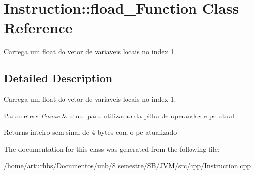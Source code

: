 \hypertarget{classInstruction_1_1fload__1Function}{}\section{Instruction\+:\+:fload\+\_\+Function Class Reference}
\label{classInstruction_1_1fload__1Function}


Carrega um float do vetor de variaveis locais no index 1.  




\subsection{Detailed Description}
Carrega um float do vetor de variaveis locais no index 1. 


\begin{DoxyParams}{Parameters}
{\em \hyperlink{classFrame}{Frame}} & atual para utilizacao da pilha de operandos e pc atual \\
\hline
\end{DoxyParams}
\begin{DoxyReturn}{Returns}
inteiro sem sinal de 4 bytes com o pc atualizado 
\end{DoxyReturn}


The documentation for this class was generated from the following file\+:\begin{DoxyCompactItemize}
\item 
/home/arturhbs/\+Documentos/unb/8 semestre/\+S\+B/\+J\+V\+M/src/cpp/\hyperlink{Instruction_8cpp}{Instruction.\+cpp}\end{DoxyCompactItemize}
